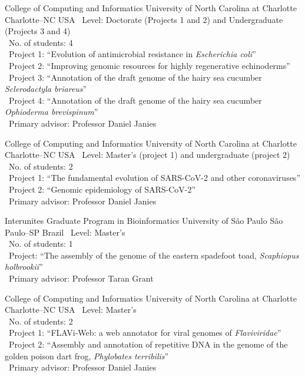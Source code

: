 \documentclass[11pt, letterpaper, sans]{moderncv}
\begin{document}
{College of Computing and Informatics}
{University of North Carolina at Charlotte}
{Charlotte--NC}
{USA}
{
	\textbullet~Level: Doctorate (Projects 1 and 2) and Undergraduate (Projects 3 and 4)\\
	\textbullet~No. of students: 4\\
	\textbullet~Project 1: ``Evolution of antimicrobial resistance in \textit{Escherichia coli}''\\
	\textbullet~Project 2: ``Improving genomic resources for highly regenerative echinoderms''\\
	\textbullet~Project 3: ``Annotation of the draft genome of the hairy sea cucumber \textit{Sclerodactyla briareus}''\\
	\textbullet~Project 4: ``Annotation of the draft genome of the hairy sea cucumber \textit{Ophioderma brevispinum}''\\
	\textbullet~Primary advisor: Professor Daniel Janies\\
}

{College of Computing and Informatics}
{University of North Carolina at Charlotte}
{Charlotte--NC}
{USA}
{
	\textbullet~Level: Master's (project 1) and undergraduate (project 2)\\
	\textbullet~No. of students: 2\\
	\textbullet~Project 1: ``The  fundamental evolution of SARS-CoV-2 and other coronaviruses''\\
	\textbullet~Project 2: ``Genomic epidemiology of SARS-CoV-2''\\
	\textbullet~Primary advisor: Professor Daniel Janies\\
}

{Interunites Graduate Program in Bioinformatics}
{University of São Paulo}
{São Paulo--SP}
{Brazil}
{
	\textbullet~Level: Master's\\
	\textbullet~No. of students: 1\\
	\textbullet~Project: ``The assembly of the genome of the eastern spadefoot toad, \emph{Scaphiopus holbrookii}''\\
	\textbullet~Primary advisor: Professor Taran Grant\\
}

\cventry{---}
{College of Computing and Informatics}
{University of North Carolina at Charlotte}
{Charlotte--NC}
{USA}
{
	\textbullet~Level: Master's\\
	\textbullet~No. of students: 2\\
	\textbullet~Project 1: ``FLAVi-Web: a web annotator for viral genomes of \emph{Flaviviridae}''\\
	\textbullet~Project 2: ``Assembly and annotation of repetitive DNA in the genome of the golden poison dart frog, \emph{Phylobates terribilis}''\\
	\textbullet~Primary advisor: Professor Daniel Janies\\
}
\end{document}
